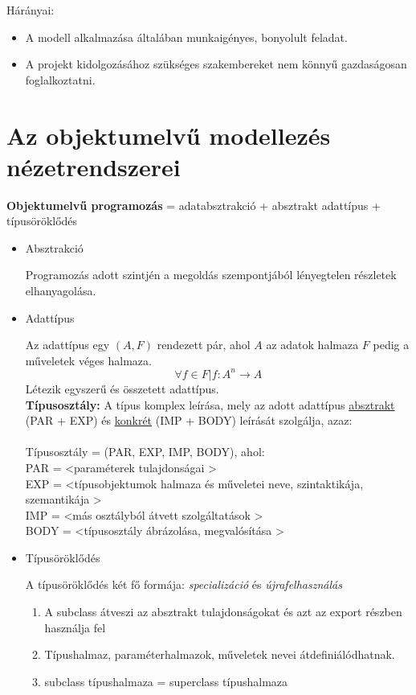 \documentclass[12pt,margin=0px]{article}
\begin{document}
\begin{enumerate}
				Hárányai:
				\begin{itemize}
					\item A modell alkalmazása általában munkaigényes, bonyolult feladat.
					\item A projekt kidolgozásához szükséges szakembereket nem könnyű
					gazdaságosan foglalkoztatni.
				\end{itemize}
		\end{enumerate}

	\section*{Az objektumelvű modellezés nézetrendszerei}
	
		\textbf{Objektumelvű programozás} = adatabsztrakció + absztrakt adattípus + típusöröklődés
		\begin{itemize}
			\item Absztrakció
			
				Programozás adott szintjén a megoldás szempontjából
				lényegtelen részletek elhanyagolása.
				
			\item Adattípus
				
    Az adattípus egy $ (A,F) $ rendezett pár, ahol $ A $ az adatok halmaza $ F $ pedig a műveletek véges halmaza.
    \[
        \forall f \in F | f : A^n \rightarrow A
    \]
    Létezik egyszerű és összetett adattípus.\\
    \textbf{Típusosztály:} A típus komplex leírása, mely az adott adattípus \underline{absztrakt} (PAR + EXP) és \underline{konkrét} (IMP + BODY) leírását szolgálja, azaz:\\\\
	Típusosztály = (PAR, EXP, IMP, BODY), ahol:\\
	PAR = \textless paraméterek tulajdonságai \textgreater\\
	EXP = \textless típusobjektumok halmaza és műveletei neve, szintaktikája, szemantikája \textgreater\\
	IMP = \textless más osztályból átvett szolgáltatások \textgreater\\
	BODY = \textless típusosztály ábrázolása, megvalósítása \textgreater\\
				
	\item Típusöröklődés
				
	A típusöröklődés két fő formája: \textit{specializáció} és  \textit{újrafelhasználás}
	\begin{enumerate}
		\item A subclass átveszi az absztrakt tulajdonságokat és azt az export részben használja fel
		\item Típushalmaz, paraméterhalmazok, műveletek nevei átdefiniálódhatnak.
		\item subclass típushalmaza = superclass típushalmaza
	\end{enumerate}
				

\end{itemize}
\end{document}
